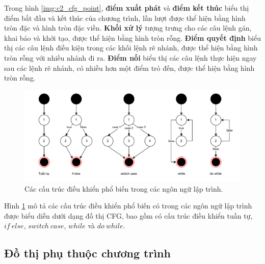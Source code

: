 Trong hình \ref{img:c2_cfg_point}, \textbf{điểm xuất phát} và \textbf{điểm kết thúc} biểu thị điểm bắt đầu và kết thúc của chương trình, lần lượt được thể hiện bằng hình tròn đặc và hình tròn đặc viền.
\textbf{Khối xử lý} tượng trưng cho các câu lệnh gán, khai báo và khởi tạo, được thể hiện bằng hình tròn rỗng.
\textbf{Điểm quyết định} biểu thị các câu lệnh điều kiện trong các khối lệnh rẽ nhánh, được thể hiện bằng hình tròn rỗng với nhiều nhánh đi ra.
\textbf{Điểm nối} biểu thị các câu lệnh thực hiện ngay sau các lệnh rẽ nhánh, có nhiều hơn một điểm trỏ đến, được thể hiện bằng hình tròn rỗng.

\begin{figure}[H]
  \includegraphics[width=1\columnwidth] {figures/c2/c2_cfg_line.drawio.pdf}
  \centering
  \caption{Các cấu trúc điều khiển phổ biến trong các ngôn ngữ lập trình.}
  \label{img:c2_cfg_line}
\end{figure}

Hình \ref{img:c2_cfg_line} mô tả các cấu trúc điều khiển phổ biến có trong các ngôn ngữ lập trình được biểu diễn dưới dạng đồ thị CFG, bao gồm có cấu trúc điều khiển tuần tự, $if\ else$, $switch\ case$, $while$ và $do\ while$.

\subsection{Đồ thị phụ thuộc chương trình}


